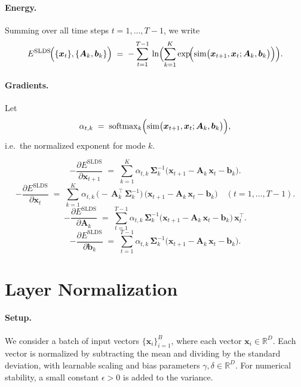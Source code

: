 \documentclass{article}
\begin{document}
\paragraph{Energy.}
Summing over all time steps \(t = 1,\ldots,T-1\), we write
\begin{equation}
E^{\mathrm{SLDS}}\!\Bigl(\{\bm{x}_t\}, \{\bm{A}_k, \bm{b}_k\}\Bigr)
\;=\;
-\sum_{t=1}^{T-1}\,
\ln \Bigl(\sum_{k=1}^K
\exp\!\Bigl(
\mathrm{sim}\bigl(\bm{x}_{t+1}, \bm{x}_t; \bm{A}_k, \bm{b}_k\bigr)
\Bigr)\Bigr).
\end{equation}

\paragraph{Gradients.}
Let 
\[
\alpha_{t,k} 
\;=\;
\mathrm{softmax}_{k}\Bigl(
\mathrm{sim}\bigl(\bm{x}_{t+1}, \bm{x}_t; \bm{A}_k, \bm{b}_k\bigr)\Bigr),
\]
i.e.\ the normalized exponent for mode \(k\).  

\[
-\frac{\partial E^{\mathrm{SLDS}}}{\partial \bm{x}_{t+1}}
\;=\;
\sum_{k=1}^K 
\alpha_{t,k}\,\bm{\Sigma}_k^{-1}
\bigl(\bm{x}_{t+1} - \bm{A}_k\,\bm{x}_t - \bm{b}_k\bigr).
\]
\[
-\frac{\partial E^{\mathrm{SLDS}}}{\partial \bm{x}_t}
\;=\;
\sum_{k=1}^K 
\alpha_{t,k}\,
\bigl(-\,\bm{A}_k^\top\,\bm{\Sigma}_k^{-1}\bigr)\,
\bigl(\bm{x}_{t+1} - \bm{A}_k\,\bm{x}_t - \bm{b}_k\bigr)
\quad (t=1,\dots,T-1).
\]
\[
-\frac{\partial E^{\mathrm{SLDS}}}{\partial \bm{A}_k}
\;=\;
\sum_{t=1}^{T-1}
\alpha_{t,k}\,\bm{\Sigma}_k^{-1}
\bigl(\bm{x}_{t+1} - \bm{A}_k\,\bm{x}_t - \bm{b}_k\bigr)\,\bm{x}_t^\top.
\]
\[
-\frac{\partial E^{\mathrm{SLDS}}}{\partial \bm{b}_k}
\;=\;
\sum_{t=1}^{T-1}
\alpha_{t,k}\,\bm{\Sigma}_k^{-1}
\bigl(\bm{x}_{t+1} - \bm{A}_k\,\bm{x}_t - \bm{b}_k\bigr).
\]

\section{Layer Normalization}

\paragraph{Setup.}
We consider a batch of input vectors \(\{\bm{x}_i\}_{i=1}^B\), where each vector \(\bm{x}_i \in \mathbb{R}^D\). Each vector is normalized by subtracting the mean and dividing by the standard deviation, with learnable scaling and bias parameters \(\gamma, \delta \in \mathbb{R}^D\). For numerical stability, a small constant \(\epsilon > 0\) is added to the variance.
\end{document}
